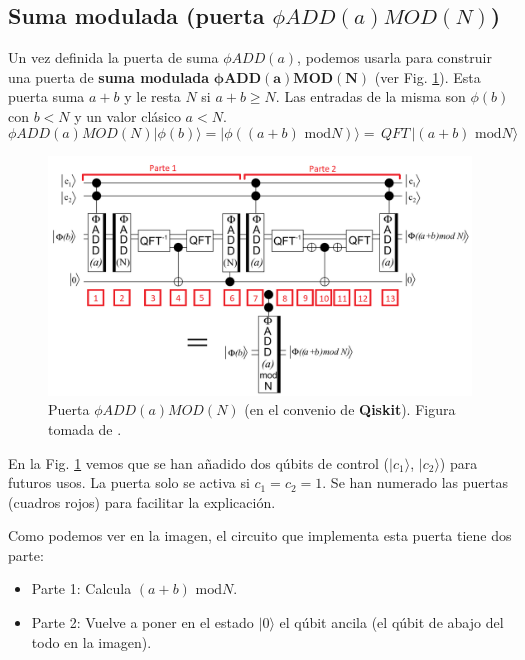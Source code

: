 \documentclass[a4paper,11pt]{book} %
\numberwithin{equation}{chapter}
\begin{document}
\subsection{Suma modulada (puerta $\phi ADD(a)MOD(N)$)} \label{sec_2n+3-Puerta-phiADD(a)MOD(N)}

Un vez definida la puerta de suma $\phi ADD(a)$, podemos usarla para construir una puerta de \textbf{suma modulada} $\bm{\phi ADD(a)MOD(N)}$ (ver Fig. \ref{Fig_idea_puerta_phiADD(a)MOD(N)}). Esta puerta suma $a+b$ y le resta $N$ si $a+b \geq N$. Las entradas de la misma son $\phi(b)$ con $b < N$ y un valor clásico $a < N$.
	\begin{equation}
	\boxed{\phi ADD(a)MOD(N) |\phi (b) \rangle = |\phi \left( (a+b) \text{ mod} N \right)\rangle}  = \,  QFT \, | (a+b) \text{ mod} N \rangle
	\end{equation}


	\begin{figure}[t]
	\centering 
	\includegraphics[width=1\linewidth]{Figuras/Fig-phiADD(a)MOD(N).png}
	\caption{Puerta $\phi ADD(a)MOD(N)$ (en el convenio de \textbf{Qiskit}). Figura tomada de \cite{bib_2n+3}.}
	\label{Fig_idea_puerta_phiADD(a)MOD(N)}
	\end{figure}

En la Fig. \ref{Fig_idea_puerta_phiADD(a)MOD(N)} vemos que se han añadido dos qúbits de control ($| c_1 \rangle$, $| c_2 \rangle$) para futuros usos. La puerta solo se activa si $c_1 = c_2 = 1$. Se han numerado las puertas (cuadros rojos) para facilitar la explicación.

Como podemos ver en la imagen, el circuito que implementa esta puerta tiene dos parte:
\begin{itemize}
	\item Parte 1: Calcula $(a+b) \text{ mod} N$.
	
	\item  Parte 2: Vuelve a poner en el estado $|0 \rangle$ el qúbit ancila (el qúbit de abajo del todo en la imagen).
\end{itemize}
\end{document}
